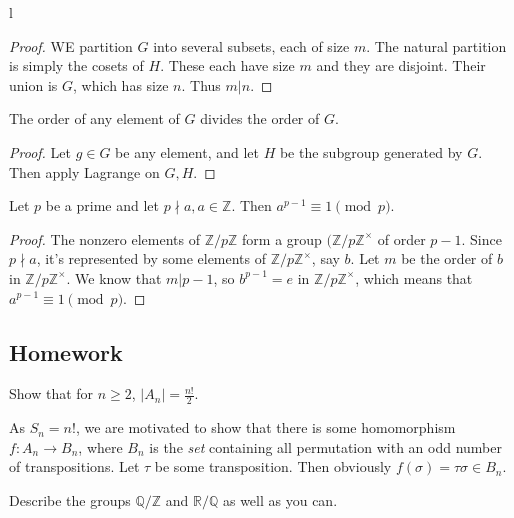 l\documentclass{scrartcl}
\begin{document}
\begin{proof}
    WE partition $G$ into several subsets, each of size $m$. The natural partition is simply the cosets of $H$. These each have size $m$ and they are disjoint. Their union is $G$, which has size $n$. Thus $m | n$.
\end{proof}

\begin{corollary}
    The order of any element of $G$ divides the order of $G$.
\end{corollary}

\begin{proof}
    Let $g \in G$ be any element, and let $H$ be the subgroup generated by $G$. Then apply Lagrange on $G, H$.
\end{proof}

\begin{theorem}
    Let $p$ be a prime and let $p \nmid a, a \in \mathbb{Z}$. Then $a^{p-1} \equiv 1 \pmod p$.
\end{theorem}

\begin{proof}
    The nonzero elements of $\mathbb{Z}/p\mathbb{Z}$ form a group $(\mathbb{Z}/p\mathbb{Z}^\times$ of order $p-1$. Since $p \nmid a$, it's represented by some elements of $\mathbb{Z}/p\mathbb{Z}^\times$, say $b$. Let $m$ be the order of $b$ in $\mathbb{Z}/p\mathbb{Z}^\times$. We know that $m | p-1$, so $b^{p-1} = e$ in $\mathbb{Z}/p\mathbb{Z}^\times$, which means that $a^{p-1} \equiv 1 \pmod p$.
\end{proof}

\newpage
\subsection{Homework}

\begin{problem}[1]
    Show that for $n \ge 2$, $|A_n| = \frac{n!}{2}$.
\end{problem}

\begin{soln}
    As $S_n = n!$, we are motivated to show that there is some homomorphism $f : A_n \rightarrow B_n$, where $B_n$ is the \textit{set} containing all permutation with an odd number of transpositions. Let $\tau$ be some transposition. Then obviously $f(\sigma) = \tau \sigma \in B_n$.
\end{soln}

\begin{problem}[2]
    Describe the groups $\mathbb{Q} / \mathbb{Z}$ and $\mathbb{R} / \mathbb{Q}$ as well as you can.
\end{problem}
\end{document}
